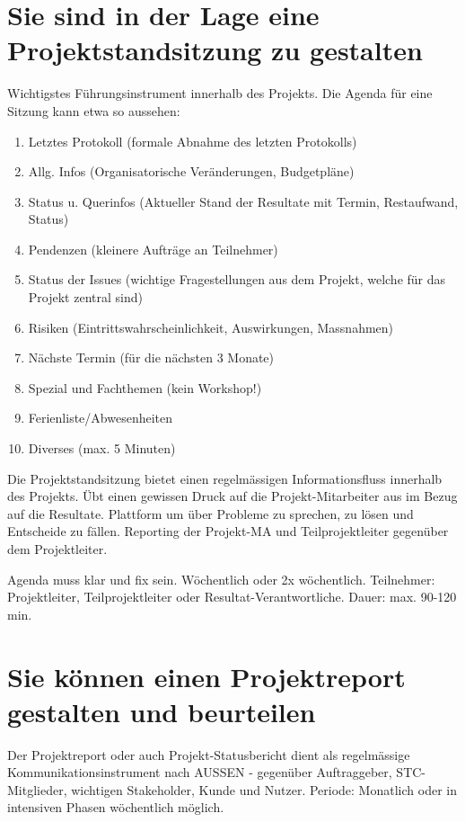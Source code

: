 \section{Sie sind in der Lage eine Projektstandsitzung zu gestalten}
Wichtigstes Führungsinstrument innerhalb des Projekts. Die Agenda für eine Sitzung kann etwa so aussehen:

\begin{enumerate}
	\item Letztes Protokoll (formale Abnahme des letzten Protokolls)
	\item Allg. Infos (Organisatorische Veränderungen, Budgetpläne)
	\item Status u. Querinfos (Aktueller Stand der Resultate mit Termin, Restaufwand, Status)
	\item Pendenzen (kleinere Aufträge an Teilnehmer)
	\item Status der Issues (wichtige Fragestellungen aus dem Projekt, welche für das Projekt zentral sind)
	\item Risiken (Eintrittswahrscheinlichkeit, Auswirkungen, Massnahmen)
	\item Nächste Termin (für die nächsten 3 Monate)
	\item Spezial und Fachthemen (kein Workshop!)
	\item Ferienliste/Abwesenheiten
	\item Diverses (max. 5 Minuten)
\end{enumerate}

Die Projektstandsitzung bietet einen regelmässigen Informationsfluss innerhalb des Projekts. Übt einen gewissen Druck auf die Projekt-Mitarbeiter aus im Bezug auf die Resultate. Plattform um über Probleme zu sprechen, zu lösen und Entscheide zu fällen. Reporting der Projekt-MA und Teilprojektleiter gegenüber dem Projektleiter.

Agenda muss klar und fix sein. Wöchentlich oder 2x wöchentlich. Teilnehmer: Projektleiter, Teilprojektleiter oder Resultat-Verantwortliche. Dauer: max. 90-120 min.

\section{Sie können einen Projektreport gestalten und beurteilen}
Der Projektreport oder auch Projekt-Statusbericht dient als regelmässige Kommunikationsinstrument nach AUSSEN - gegenüber Auftraggeber, STC-Mitglieder, wichtigen Stakeholder, Kunde und Nutzer. Periode: Monatlich oder in intensiven Phasen wöchentlich möglich.

